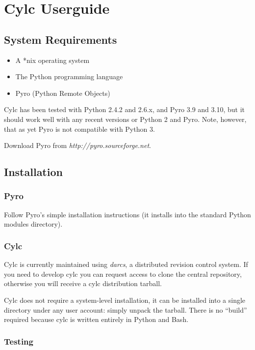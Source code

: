 \documentclass[11pt,a4paper]{article}
\begin{document}
\section{Cylc Userguide}
\label{sec:usage}

\subsection{System Requirements}

\begin{itemize}
    \item A *nix operating system
    \item The Python programming language
    \item Pyro (Python Remote Objects)
\end{itemize}

Cylc has been tested with Python 2.4.2 and 2.6.x, and Pyro 3.9 and 3.10,
but it should work well with any recent versions or Python 2 and Pyro.
Note, however, that as yet Pyro is not compatible with Python 3.

Download Pyro from {\em http://pyro.sourceforge.net}. 

\subsection{Installation}

\subsubsection{Pyro}

Follow Pyro's simple installation instructions (it installs into the
standard Python modules directory).

\subsubsection{Cylc}

Cylc is currently maintained using {\em darcs}, a distributed revision
control system. If you need to develop cylc you can request access to
clone the central repository, otherwise you will receive a cylc
distribution tarball.

Cylc does not require a system-level installation, it can be installed
into a single directory under any user account: simply unpack the
tarball. There is no ``build'' required because cylc is written entirely 
in Python and Bash.

\subsubsection{Testing}
\end{document}
